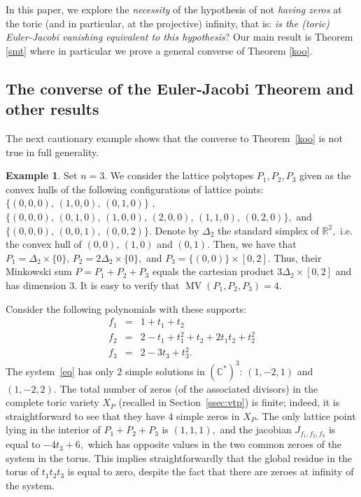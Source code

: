 \documentclass[a4paper,11pt]{amsart}
\newcommand{\MV}{\operatorname{MV}}
\newcommand{\C}{\mathbb{C}}
\newcommand{\R}{\mathbb{R}}
\newcounter{thm}
\numberwithin{thm}{section}
\numberwithin{equation}{section}
\theoremstyle{definition}
\newtheorem{example}[thm]{Example}
\theoremstyle{plain}
\begin{document}
 \medskip

In this paper, we explore the {\em necessity} of the hypothesis of not {\em having zeros}
 at the toric (and in particular, at the projective) infinity, that is: {\it is the (toric) Euler-Jacobi
vanishing equivalent to this hypothesis}? 
Our main result is Theorem \ref{smt} where in particular we prove a general converse of  Theorem \ref{koo}. 



\subsection{The converse of the Euler-Jacobi Theorem and other results}\label{ssec:cej}



The next cautionary example shows that the converse to Theorem~\ref{koo} is not true in full generality.

\begin{example} \label{ex:notindec}
Set $n=3$. We consider the lattice polytopes $P_1, P_2, P_3$  given as the convex hulls of the following configurations of lattice points: 
$\{(0,0,0),\,(1,0,0),\,(0,1,0)\}$ , $\{(0,0,0),\,(0,1,0),\,(1,0,0),\,(2,0,0),\,(1,1,0),\,(0,2,0)\},$ and $\{(0,0,0),\,(0,0,1),\,(0,0,2)\}$. Denote by $\Delta_2$ the standard simplex of $\R^2,$ i.e. the convex hull of $(0,0),\,(1,0)$ and $(0,1).$ Then, we have that $P_1=\Delta_2 \times \{0\},\, P_2=2\Delta_2\times \{0\},$ and $P_3=\{(0,0)\} \times [0,2]$. Thus, their Minkowski sum $P = P_1 +P_2 + P_3$ equals the cartesian product $3 \Delta_2 \times [0,2]$ and has dimension $3$. It is easy to verify that $\MV(P_1,P_2, P_3)=4.$

 Consider the following polynomials with these supports:
\begin{equation}\label{eq}
\begin{array}{ccl}
f_1&=& 1+t_1+t_2\\
f_2&=& 2 - t_1 + t_1^2 + t_2 + 2 t_1 t_2 + t_2^2\\
f_3&=& 2-3t_3+t_3^2.
\end{array}
\end{equation}
The system~\eqref{eq} has only  $2$ simple solutions in $(\C^*)^3:\, (1,-2,1)$ and $(1,-2,2).$   The total number of zeros (of the associated divisors) in the complete toric variety $X_P$ (recalled in Section~\ref{ssec:vtp}) is finite; indeed, it is straightforward to see that they have $4$ simple zeros in $X_P$.
The only lattice  point lying in the interior of $P_1+P_2+P_3$ is $(1,1,1),$ and the jacobian $J_{f_1, f_2, f_3}$ is equal to $-4t_3+6,$ which has opposite values in the two common zeroes of the system in the torus. This implies straightforwardly that the global residue in the torus of $t_1t_2t_3$ is equal to zero, despite the fact that there are zeroes at infinity of the system. 
\end{example}
\end{document}
